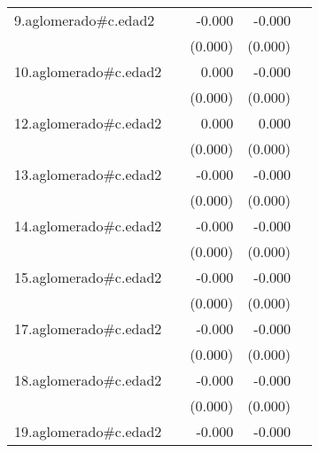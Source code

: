 {\begin{longtable}{l*{4}{D{.}{.}{-1}}}
\addlinespace
9.aglomerado#c.edad2&                     &      -0.000         &      -0.000\sym{***}&                     \\
            &                     &     (0.000)         &     (0.000)         &                     \\
\addlinespace
10.aglomerado#c.edad2&                     &       0.000         &      -0.000         &                     \\
            &                     &     (0.000)         &     (0.000)         &                     \\
\addlinespace
12.aglomerado#c.edad2&                     &       0.000\sym{*}  &       0.000         &                     \\
            &                     &     (0.000)         &     (0.000)         &                     \\
\addlinespace
13.aglomerado#c.edad2&                     &      -0.000         &      -0.000\sym{***}&                     \\
            &                     &     (0.000)         &     (0.000)         &                     \\
\addlinespace
14.aglomerado#c.edad2&                     &      -0.000         &      -0.000         &                     \\
            &                     &     (0.000)         &     (0.000)         &                     \\
\addlinespace
15.aglomerado#c.edad2&                     &      -0.000         &      -0.000\sym{*}  &                     \\
            &                     &     (0.000)         &     (0.000)         &                     \\
\addlinespace
17.aglomerado#c.edad2&                     &      -0.000         &      -0.000         &                     \\
            &                     &     (0.000)         &     (0.000)         &                     \\
\addlinespace
18.aglomerado#c.edad2&                     &      -0.000         &      -0.000\sym{*}  &                     \\
            &                     &     (0.000)         &     (0.000)         &                     \\
\addlinespace
19.aglomerado#c.edad2&                     &      -0.000         &      -0.000         &                     \\

\end{longtable}}
